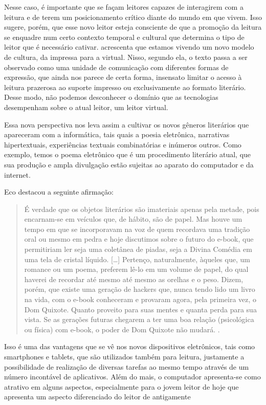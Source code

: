\begin{refsection}
    Nesse caso, é importante que se façam leitores capazes de interagirem com a leitura e de terem um posicionamento crítico diante do mundo em que vivem.  Isso sugere, porém, que esse novo leitor esteja consciente de que a promoção da leitura se enquadre num certo contexto temporal e cultural que determina o tipo de leitor que é necessário cativar. \textcite{Ramos2015Fazer} acrescenta que estamos vivendo um novo modelo de cultura, da impressa para a virtual. Nisso, segundo ela, o texto passa a ser observado como uma unidade de comunicação com diferentes formas de expressão, que ainda nos parece de certa forma, insensato limitar o acesso à leitura prazerosa ao suporte impresso ou exclusivamente ao formato literário. Desse modo, não podemos desconhecer o domínio que as tecnologias desempenham sobre o atual leitor, um leitor virtual.  

    Essa nova perspectiva nos leva assim a cultivar os novos gêneros literários que apareceram com a informática, tais quais a poesia eletrônica, narrativas hipertextuais, experiências textuais combinatórias e inúmeros outros. Como exemplo, temos o poema eletrônico que é um procedimento literário atual, que sua produção e ampla divulgação estão sujeitas ao aparato do computador e da internet.           

    Eco destacou   a seguinte afirmação: 

    \begin{quotation}
        É verdade que os objetos literários são imateriais apenas pela metade, pois encarnam-se em veículos que, de hábito, são de papel. Mas houve um tempo em que se incorporavam na voz de quem recordava uma tradição oral ou mesmo em pedra e hoje discutimos sobre o futuro do e-book, que permitiriam ler seja uma coletânea de piadas, seja a Divina Comédia em uma tela de cristal líquido. [\dots] Pertenço, naturalmente, àqueles que, um romance ou um poema, preferem lê-lo em um volume de papel, do qual haverei de recordar até mesmo até mesmo as orelhas e o peso. Dizem, porém, que existe uma geração de hackers que, nunca tendo lido um livro na vida, com o e-book conheceram e provaram agora, pela primeira vez, o Dom Quixote. Quanto proveito para suas mentes e quanta perda para sua vista. Se as gerações futuras chegarem a ter uma boa relação (psicológica ou física) com e-book, o poder de Dom Quixote não mudará. \cite[p.~9--10]{Eco2003Sobre}.
    \end{quotation}


    Isso é uma das vantagens que se vê nos novos dispositivos eletrônicos, tais como smartphones e tablets, que são utilizados também para leitura, justamente a possibilidade de realização de diversas tarefas ao mesmo tempo através de um número incontável de aplicativos. Além do mais, o computador apresenta-se como atrativo em alguns aspectos, especialmente para o jovem leitor de hoje que apresenta um aspecto diferenciado do leitor de antigamente 


\end{refsection}
